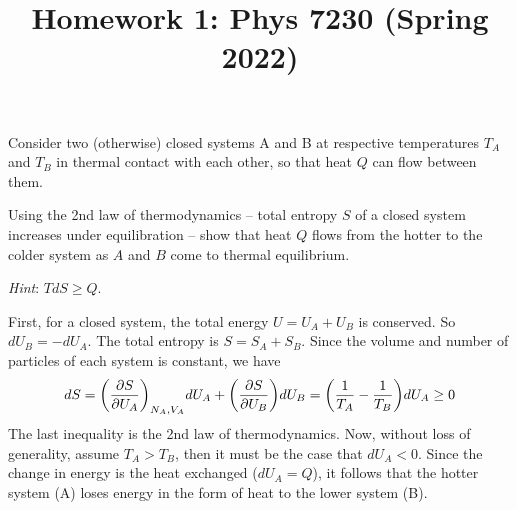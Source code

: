 \documentclass[12pt]{article}
\title{Homework 1: Phys 7230 (Spring 2022)}
\begin{document}
\maketitle
\begin{problem}{1}
Consider two (otherwise) closed systems A and B at respective temperatures $T_A$
and $T_B$ in thermal contact with each other, so that heat $Q$ can flow between
them.

Using the 2nd law of thermodynamics -- total entropy $S$ of a closed system
increases under equilibration -- show that heat $Q$ flows from the hotter to the
colder system as $A$ and $B$ come to thermal equilibrium.

\textit{Hint}: $TdS\geq Q$.

\begin{solution}
First, for a closed system, the total energy $U=U_A+U_B$ is conserved. So
$dU_B=-dU_A$. The total entropy is $S=S_A+S_B$. Since the volume and number of
particles of each system is constant, we have
\begin{align}
    dS
    =\qty(\frac{\partial S}{\partial U_A})_{N_A,V_A}dU_A
    +\qty(\frac{\partial S}{\partial U_B})dU_B
    =\qty(\frac1{T_A}-\frac1{T_B})dU_A\geq 0
\end{align}
The last inequality is the 2nd law of thermodynamics. Now, without loss of
generality, assume $T_A>T_B$, then it must be the case that $dU_A<0$. Since
the change in energy is the heat exchanged ($dU_A=Q$), it follows that the
hotter system (A) loses energy in the form of heat to the lower system (B).
\end{solution}
\end{problem}
\end{document}
